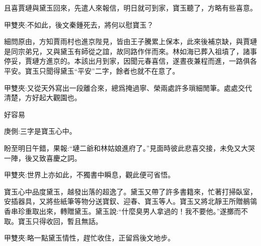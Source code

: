 \begin{parag}
    且喜賈璉與黛玉回來，先遣人來報信，明日就可到家，寶玉聽了，方略有些喜意。\begin{note}甲雙夾:不如此，後文秦鍾死去，將何以慰寶玉？\end{note}細問原由，方知賈雨村也進京陛見，皆由王子騰累上保本，此來後補京缺，與賈璉是同宗弟兄，又與黛玉有師從之誼，故同路作伴而來。林如海已葬入祖墳了，諸事停妥，賈璉方進京的。本該出月到家，因聞元春喜信，遂晝夜兼程而進，一路俱各平安。寶玉只聞得黛玉“平安”二字，餘者也就不在意了。\begin{note}甲雙夾:又從天外寫出一段離合來，總爲掩過寧、榮兩處許多瑣細閒筆。處處交代清楚，方好起大觀園也。\end{note}
\end{parag}


\begin{parag}
    好容易\begin{note}庚側:三字是寶玉心中。\end{note}盼至明日午錯，果報:“璉二爺和林姑娘進府了。”見面時彼此悲喜交接，未免又大哭一陣，後又致喜慶之詞。\begin{note}甲雙夾:世界上亦如此，不獨書中瞬息，觀此便可省悟。\end{note}寶玉心中品度黛玉，越發出落的超逸了。黛玉又帶了許多書籍來，忙著打掃臥室，安插器具，又將些紙筆等物分送寶釵、迎春、寶玉等人。寶玉又將北靜王所贈鶺鴒香串珍重取出來，轉贈黛玉。黛玉說:“什麼臭男人拿過的！我不要他。”遂擲而不取。寶玉只得收回，暫且無話。\begin{note}甲雙夾:略一點黛玉情性，趕忙收住，正留爲後文地步。\end{note}
\end{parag}


